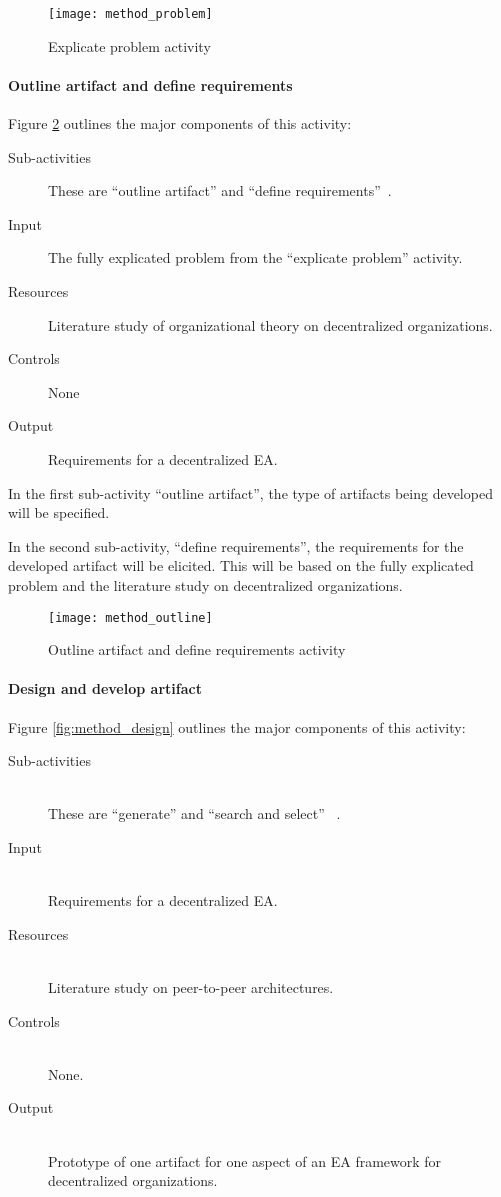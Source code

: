 \begin{figure}
\centering
\texttt{[image: method\_problem]}
\caption{Explicate problem activity}
\label{fig:method_problem}
\end{figure}

\paragraph*{Outline artifact and define requirements}

Figure \ref{fig:method_outline} outlines the major components of this activity:
\begin{description}
  \item[Sub-activities] These are ``outline artifact'' and ``define requirements''~\cite[Ch. 6]{johannessonPerjons2012}.
  \item[Input] The fully explicated problem from the ``explicate problem'' activity. 
  \item[Resources] Literature study of organizational theory on decentralized organizations. 
  \item[Controls] None
  \item[Output] Requirements for a decentralized EA. 
\end{description}

In the first sub-activity ``outline artifact'', the type of artifacts being developed will be specified. 

In the second sub-activity, ``define requirements'', the requirements for the developed artifact will be elicited. This will be based on the fully explicated problem and the literature study on decentralized organizations.

\begin{figure}
\centering
\texttt{[image: method\_outline]}
\caption{Outline artifact and define requirements activity}
\label{fig:method_outline}
\end{figure}

\paragraph*{Design and develop artifact}

Figure \ref{fig:method_design} outlines the major components of this activity:
\begin{description}
  \item[Sub-activities] \hfill \\ These are ``generate'' and ``search and select'' ~\cite[Ch. 7]{johannessonPerjons2012}.
  \item[Input]  \hfill \\ Requirements for a decentralized EA. 
  \item[Resources] \hfill \\ Literature study on peer-to-peer architectures. 
  \item[Controls] \hfill \\ None.
  \item[Output] \hfill \\ Prototype of one artifact for one aspect of an EA framework for decentralized organizations. 
\end{description}

